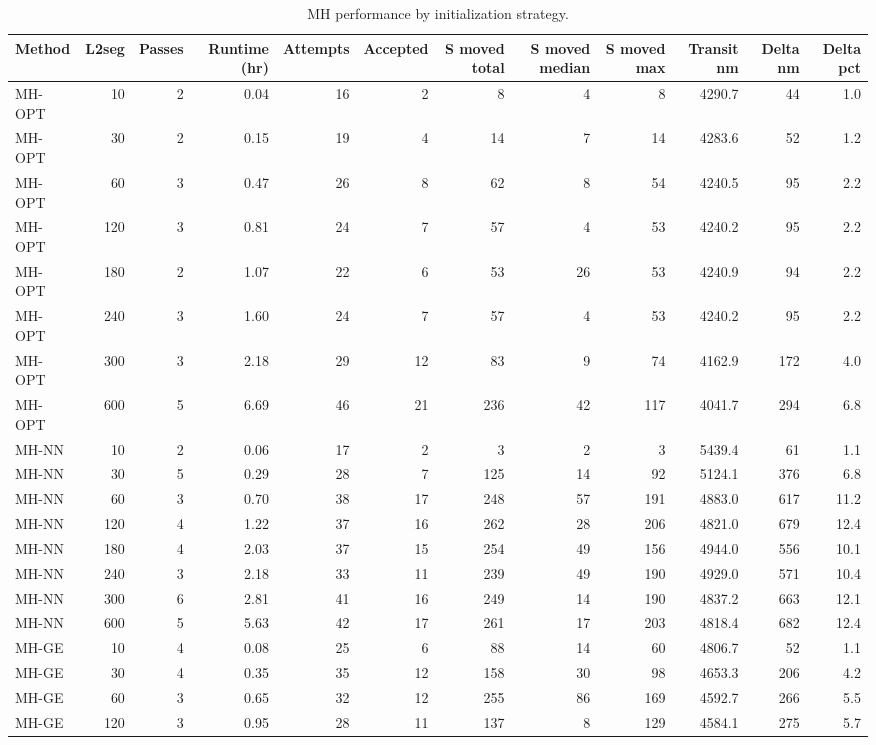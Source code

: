 \begin{table}[b]
\centering
\caption{MH performance by initialization strategy.}
\label{tab:results}
\begin{tabular}{lrrr|rr|rrr|rrr}
\toprule
Method & L2seg & Passes & Runtime (hr) & Attempts & Accepted & S moved total & S moved median & S moved max & Transit nm & Delta nm & Delta pct
\\
\midrule
MH-OPT & 10 & 2 & 0.04 & 16 &  2 &   8 & 4 & 8 & 4290.7 & 44 & 1.0 \\
MH-OPT & 30 & 2 & 0.15 & 19 &  4 &  14 & 7 & 14 & 4283.6 & 52 & 1.2 \\
MH-OPT & 60 & 3 & 0.47 & 26 &  8 &  62 & 8 & 54 & 4240.5 & 95 & 2.2 \\
MH-OPT & 120 & 3 & 0.81 & 24 &  7 &  57 & 4 & 53 & 4240.2 & 95 & 2.2 \\
MH-OPT & 180 & 2 & 1.07 & 22 &  6 &  53 & 26 & 53 & 4240.9 & 94 & 2.2 \\
MH-OPT & 240 & 3 & 1.60 & 24 &  7 &  57 & 4 & 53 & 4240.2 & 95 & 2.2 \\
MH-OPT & 300 & 3 & 2.18 & 29 & 12 &  83 & 9 & 74 & 4162.9 & 172 & 4.0 \\
MH-OPT & 600 & 5 & 6.69 & 46 & 21 & 236 & 42 & 117 & 4041.7 & 294 & 6.8 \\
MH-NN & 10 & 2 & 0.06 & 17 &  2 &   3 & 2 & 3 & 5439.4 & 61 & 1.1 \\
MH-NN & 30 & 5 & 0.29 & 28 &  7 & 125 & 14 & 92 & 5124.1 & 376 & 6.8 \\
MH-NN & 60 & 3 & 0.70 & 38 & 17 & 248 & 57 & 191 & 4883.0 & 617 & 11.2 \\
MH-NN & 120 & 4 & 1.22 & 37 & 16 & 262 & 28 & 206 & 4821.0 & 679 & 12.4 \\
MH-NN & 180 & 4 & 2.03 & 37 & 15 & 254 & 49 & 156 & 4944.0 & 556 & 10.1 \\
MH-NN & 240 & 3 & 2.18 & 33 & 11 & 239 & 49 & 190 & 4929.0 & 571 & 10.4 \\
MH-NN & 300 & 6 & 2.81 & 41 & 16 & 249 & 14 & 190 & 4837.2 & 663 & 12.1 \\
MH-NN & 600 & 5 & 5.63 & 42 & 17 & 261 & 17 & 203 & 4818.4 & 682 & 12.4 \\
MH-GE & 10 & 4 & 0.08 & 25 &  6 &  88 & 14 & 60 & 4806.7 & 52 & 1.1 \\
MH-GE & 30 & 4 & 0.35 & 35 & 12 & 158 & 30 & 98 & 4653.3 & 206 & 4.2 \\
MH-GE & 60 & 3 & 0.65 & 32 & 12 & 255 & 86 & 169 & 4592.7 & 266 & 5.5 \\
MH-GE & 120 & 3 & 0.95 & 28 & 11 & 137 & 8 & 129 & 4584.1 & 275 & 5.7 \\

\end{tabular}
\end{table}
